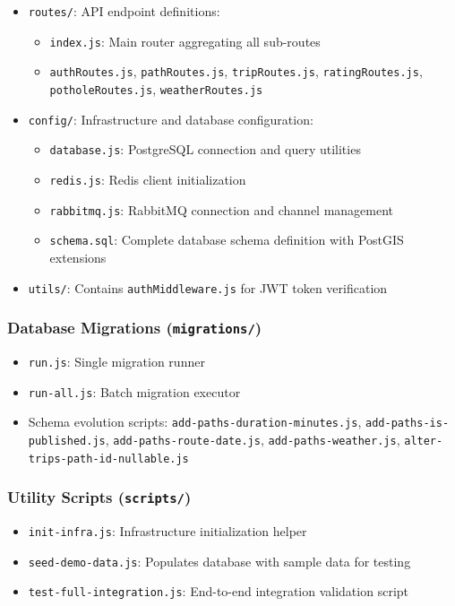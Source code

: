 \begin{itemize}
    \item \texttt{routes/}: API endpoint definitions:
    \begin{itemize}
        \item \texttt{index.js}: Main router aggregating all sub-routes
        \item \texttt{authRoutes.js}, \texttt{pathRoutes.js}, \texttt{tripRoutes.js}, \texttt{ratingRoutes.js}, \texttt{potholeRoutes.js}, \texttt{weatherRoutes.js}
    \end{itemize}
    
    \item \texttt{config/}: Infrastructure and database configuration:
    \begin{itemize}
        \item \texttt{database.js}: PostgreSQL connection and query utilities
        \item \texttt{redis.js}: Redis client initialization
        \item \texttt{rabbitmq.js}: RabbitMQ connection and channel management
        \item \texttt{schema.sql}: Complete database schema definition with PostGIS extensions
    \end{itemize}
    
    \item \texttt{utils/}: Contains \texttt{authMiddleware.js} for JWT token verification
\end{itemize}

\subsubsection{Database Migrations (\texttt{migrations/})}
\begin{itemize}
    \item \texttt{run.js}: Single migration runner
    \item \texttt{run-all.js}: Batch migration executor
    \item Schema evolution scripts: \texttt{add-paths-duration-minutes.js}, \texttt{add-paths-is-published.js}, \texttt{add-paths-route-date.js}, \texttt{add-paths-weather.js}, \texttt{alter-trips-path-id-nullable.js}
\end{itemize}

\subsubsection{Utility Scripts (\texttt{scripts/})}
\begin{itemize}
    \item \texttt{init-infra.js}: Infrastructure initialization helper
    \item \texttt{seed-demo-data.js}: Populates database with sample data for testing
    \item \texttt{test-full-integration.js}: End-to-end integration validation script
\end{itemize}

